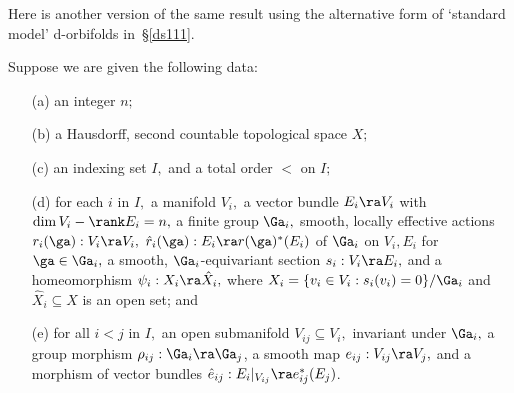\documentclass{article}
\begin{document}
Here is another version of the same result using the alternative
form of `standard model' d-orbifolds
in~\S\ref{ds111}.

\begin{thm} Suppose we are given the following data:
\begin{itemize}
\setlength{\itemsep}{0pt}
\setlength{\parsep}{0pt}
\item[{\rm(a)}] an integer $n;$
\item[{\rm(b)}] a Hausdorff, second countable topological space $X;$
\item[{\rm(c)}] an indexing set\/ $I,$ and a total order $<$ on $I;$
\item[{\rm(d)}] for each\/ $i$ in $I,$ a manifold\/ $V_i,$ a vector
bundle $E_i\ra V_i$ with\/ $\dim V_i-\rank E_i=n,$ a finite
group\/ $\Ga_i,$ smooth, locally effective actions\/
$r_i(\ga):V_i\ra V_i,$ $\hat r_i(\ga):E_i\ra r(\ga)^*(E_i)$ of\/
$\Ga_i$ on $V_i,E_i$ for $\ga\in\Ga_i,$ a smooth,
$\Ga_i$-equivariant section $s_i:V_i\ra E_i,$ and a
homeomorphism $\psi_i:X_i\ra\hat X_i,$ where $X_i=\{v_i\in
V_i:s_i(v_i)=0\}/\Ga_i$ and\/ $\hat X_i\subseteq X$ is an open
set; and
\item[{\rm(e)}] for all\/ $i<j$ in $I,$ an open submanifold\/
$V_{ij}\subseteq V_i,$ invariant under $\Ga_i,$ a group morphism
$\rho_{ij}:\Ga_i\ra\Ga_j$, a smooth map $e_{ij}:V_{ij}\ra V_j,$
and a morphism of vector bundles $\hat
e_{ij}:E_i\vert_{V_{ij}}\ra e_{ij}^*(E_j)$.
\end{itemize}


\end{thm}
\end{document}
